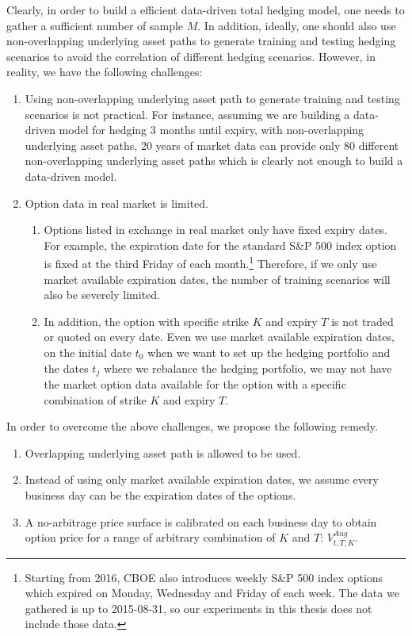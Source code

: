\documentclass[letterpaper,12pt,titlepage,oneside,final]{book}
\numberwithin{equation}{section}
\theoremstyle{definition}
\begin{document}
Clearly, in order to build a efficient data-driven total hedging model, one needs to gather a sufficient  number of sample  $M$.  In addition, ideally, one should also use non-overlapping underlying asset paths to generate training and testing hedging scenarios to avoid the correlation of different hedging scenarios.
However, in reality,  we have the following challenges:
\begin{enumerate}
	\item Using non-overlapping underlying asset path to  generate training and testing scenarios is not practical. For instance, assuming we are building a data-driven model for hedging 3 months until expiry, with non-overlapping underlying asset paths, 20 years of market data can provide only 80 different non-overlapping underlying asset paths which is clearly not enough to build a data-driven model.
	\item Option data  in real market is limited. 
	\begin{enumerate}
		\item Options listed in exchange in real market only have fixed expiry dates. For example, the expiration date for the standard S\&P 500 index option is fixed at the third Friday of each month.\footnote{Starting from 2016, CBOE also introduces weekly S\&P 500 index options which expired on Monday, Wednesday and Friday of each week. The data we gathered is up to 2015-08-31, so our experiments in this thesis does not include those data.} Therefore, if we only use market available expiration dates, the number of training scenarios will also be severely limited. 
		\item In addition, the option with specific strike $K$ and expiry $T$ is not traded or quoted on every date. Even we use market available expiration dates, on the initial date $t_0$ when we want to set up the hedging portfolio and the dates $t_j$ where we rebalance the hedging portfolio, we may not have the  market option data available for  the option with a specific combination of strike $K$ and expiry $T$.
	\end{enumerate}
\end{enumerate}
In order to overcome the above challenges, we propose the following remedy.  
\begin{enumerate}
	\item Overlapping underlying asset path is allowed to be used.
	\item Instead of using only market available expiration dates, we assume every business day can be the expiration dates of the options.
	\item A no-arbitrage price surface is calibrated on each business day to obtain option price for a range of arbitrary combination of  $K$ and $T$: $V^{Aug}_{t,T,K}$.
\end{enumerate}
\end{document}
